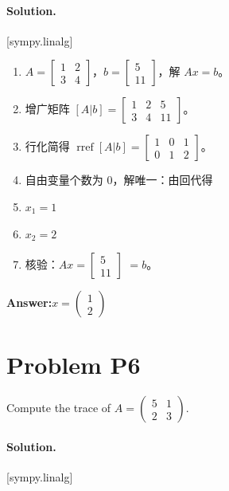 \documentclass[11pt,a4paper]{ctexart}
\newcommand{\solvertag}[1]{{\footnotesize\color{gray}\textsf{[#1]}}}
\begin{document}
\paragraph{Solution.} \solvertag{sympy.linalg} 

\begin{enumerate}[leftmargin=*]
  \item $A = \left[\begin{matrix}1 & 2\\3 & 4\end{matrix}\right]$，$b = \left[\begin{matrix}5\\11\end{matrix}\right]$，解 $Ax = b$。
  \item 增广矩阵 $[A|b] = \left[\begin{matrix}1 & 2 & 5\\3 & 4 & 11\end{matrix}\right]$。
  \item 行化简得 $\operatorname{rref}[A|b] = \left[\begin{matrix}1 & 0 & 1\\0 & 1 & 2\end{matrix}\right]$。
  \item 自由变量个数为 0，解唯一：由回代得
  \item $x_{1} = 1$
  \item $x_{2} = 2$
  \item 核验：$A x = \left[\begin{matrix}5\\11\end{matrix}\right]$ $= b$。
\end{enumerate}

\noindent\textbf{Answer:}\quad $x = \begin{pmatrix}1\\2\end{pmatrix}$

\medskip

\section*{Problem P6}
Compute the trace of $A = \begin{pmatrix} 5 & 1 \\ 2 & 3 \end{pmatrix}$.

\paragraph{Solution.} \solvertag{sympy.linalg} 
\end{document}

